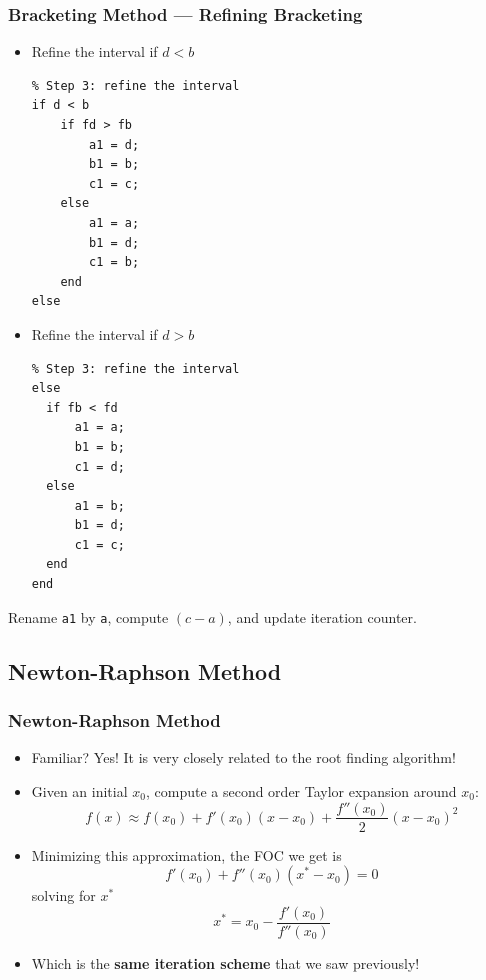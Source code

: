 \documentclass[11pt,xcolor={svgnames},aspectratio=169,usepdftitle=false,notheorems]{beamer}
\begin{document}
\begin{frame}[fragile]
  \frametitle{Bracketing Method --- Refining Bracketing}
\begin{minipage}{0.48\textwidth}
  \begin{itemize}
    \item Refine the interval if $d < b$
    \begin{lstlisting}
% Step 3: refine the interval
if d < b
    if fd > fb
        a1 = d;
        b1 = b;
        c1 = c;
    else
        a1 = a;
        b1 = d;
        c1 = b;
    end
else
    \end{lstlisting}
  \end{itemize}
\end{minipage}
\begin{minipage}{0.48\textwidth}
  \begin{itemize}
    \item Refine the interval if $d > b$
    \begin{lstlisting}
% Step 3: refine the interval
else
  if fb < fd
      a1 = a;
      b1 = b;
      c1 = d;
  else
      a1 = b;
      b1 = d;
      c1 = c;
  end
end
    \end{lstlisting}
  \end{itemize}
\end{minipage}
Rename \verb;a1; by \verb;a;, compute $(c - a)$, and update iteration counter.
\end{frame}

\subsection{Newton-Raphson Method}

\begin{frame}
  \frametitle{Newton-Raphson Method}
\begin{itemize}
  \item Familiar? Yes! It is very closely related to the root finding algorithm!
  \item Given an initial $x_0$, compute a second order Taylor expansion around $x_0$:
  \[
  f(x) \approx f(x_0) + f'(x_0)(x - x_0) + \frac{f''(x_0)}{2}(x - x_0)^2
  \]
  \item Minimizing this approximation, the FOC we get is
  \[
  f'(x_0) + f''(x_0)(x^* - x_0) = 0
  \]
  solving for $x^*$
  \[
  x^* = x_0 - \frac{f'(x_0)}{f''(x_0)}
  \]
  \item Which is the \alert{\textbf{same iteration scheme}} that we saw previously!
\end{itemize}
\end{frame}
\end{document}
